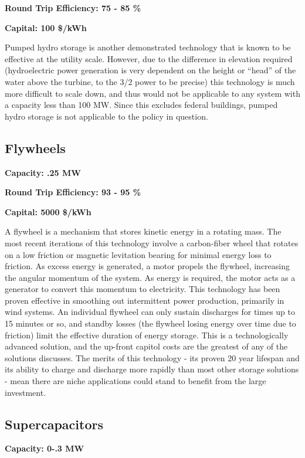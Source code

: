 \noindent\textbf{Round Trip Efficiency: 75 - 85 \%}

\noindent\textbf{Capital: 100 \$/kWh}

Pumped hydro storage is another demonstrated technology that is known to be
effective at the utility scale. However, due to the difference in elevation
required (hydroelectric power generation is very dependent on the height or
``head'' of the water above the turbine, to the 3/2 power to be precise) this
technology is much more difficult to scale down, and thus would not be
applicable to any system with a capacity less than 100 MW. Since this excludes
federal buildings, pumped hydro storage is not applicable to the policy in
question.

\subsection{Flywheels}
\textbf{Capacity: .25 MW}

\noindent\textbf{Round Trip Efficiency: 93 - 95 \%}

\noindent\textbf{Capital: 5000 \$/kWh}

A flywheel is a mechanism that stores kinetic energy in a rotating mass. The
most recent iterations of this technology involve a carbon-fiber wheel that
rotates on a low friction or magnetic levitation bearing for minimal energy
loss to friction. As excess energy is generated, a motor propels the flywheel,
increasing the angular momentum of the system. As energy is required, the motor
acts as a generator to convert this momentum to electricity. This technology
has been proven effective in smoothing out intermittent power production,
primarily in wind systems. An individual flywheel can only sustain discharges
for times up to 15 minutes or so, and standby losses (the flywheel losing
energy over time due to friction) limit the effective duration of energy
storage.  This is a technologically advanced solution, and the up-front capitol
costs are the greatest of any of the solutions discusses. The merits of this
technology - its proven 20 year lifespan and its ability to charge and
discharge more rapidly than most other storage solutions - mean there are niche
applications could stand to benefit from the large investment.


\subsection{Supercapacitors}
\textbf{Capacity: 0-.3 MW}

